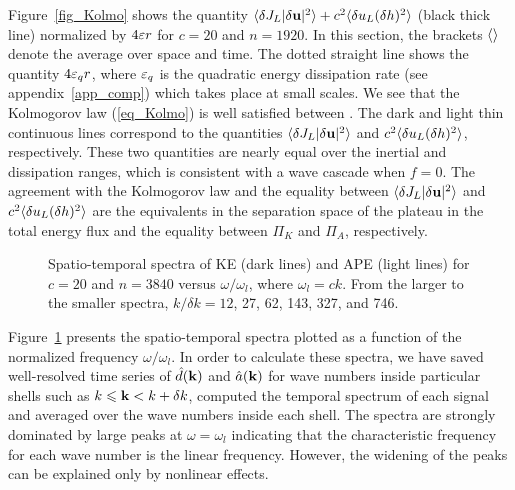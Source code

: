 Figure~\ref{fig_Kolmo} shows the quantity $\langle \delta J_L|\delta
\textbf{u}|^2  \rangle + c^2\langle \delta u_L(\delta h)^2  \rangle$ (black thick line)
normalized by $4 \varepsilon r$ for $c = 20$ and $n = 1920$.
%
In this section, the brackets $\langle  \rangle$ denote the average over space
and time.
%
The dotted straight line shows the quantity $4 \varepsilon_q r$, where
$\varepsilon_q$ is the quadratic energy dissipation rate (see
appendix~\ref{app_comp}) which takes place at small scales.
%
We see that the Kolmogorov law (\ref{eq_Kolmo}) is well satisfied
between .  The dark and
light thin continuous lines correspond to the quantities $\langle \delta
J_L|\delta \textbf{u}|^2  \rangle$ and $c^2\langle \delta u_L(\delta h)^2 \rangle$,
respectively.
%
These two quantities are nearly equal over the inertial and
dissipation ranges, which is consistent with a wave cascade when
$f=0$.
%
The agreement with the Kolmogorov law and the equality between
$\langle \delta J_L|\delta \textbf{u}|^2  \rangle$ and $c^2\langle \delta u_L(\delta
h)^2 \rangle$ are the equivalents in the separation space of the plateau in
the total energy flux and the equality between $\Pi_K$ and $\Pi_A$,
respectively.




\begin{figure}
\caption{Spatio-temporal spectra of KE (dark lines) and APE (light
lines) for $c = 20$ and $n = 3840$ versus $\omega/\omega_l$, where
$\omega_l = c k$.  From the larger to the smaller spectra, $k/\delta k
= 12$, 27, 62, 143, 327, and 746.  }
\label{fig_spatiotemp_spectra}
\end{figure}

Figure~\ref{fig_spatiotemp_spectra} presents the spatio-temporal
spectra plotted as a function of the normalized frequency
$\omega/\omega_l$.
In order to calculate these spectra, we have saved well-resolved time
series of $\hat d(\textbf{k})$ and $\hat a(\textbf{k})$ for wave numbers inside
particular shells such as $k\leqslant \textbf{k}<k+\delta k$, computed the
temporal spectrum of each signal and averaged over the wave numbers
inside each shell.
%
The spectra are strongly dominated by large peaks at $\omega =
\omega_l$ indicating that the characteristic frequency for each wave
number is the linear frequency.  However, the widening of the peaks
can be explained only by nonlinear effects.  












